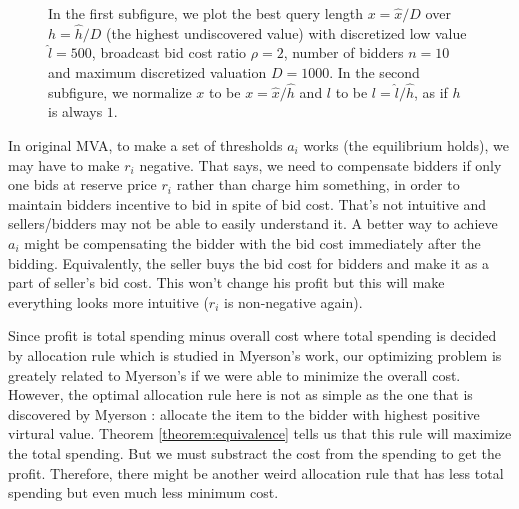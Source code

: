 \begin{figure}
\centering
  \caption{In the first subfigure, we plot the best query length $x = \hat x / D$ over $h = \hat h / D$ (the highest
      undiscovered value) with discretized low value $\hat l = 500$,
      broadcast bid cost ratio $\rho = 2$,
      number of bidders $n = 10$ and maximum discretized valuation
      $D = 1000$. In the second subfigure, we normalize $x$ to be $x = \hat x / \hat h$ and
      $l$ to be $l = \hat l / \hat h$, as if $h$ is always $1$.}
\end{figure}

\begin{proposition}
In original MVA, to make a set of thresholds $a_i$ works (the
equilibrium holds), we may have to make $r_i$ negative. That says, we need to
compensate bidders if only one bids at reserve price $r_i$ rather than charge
him something, in order to maintain bidders incentive to bid in spite of
bid cost. That's not intuitive and sellers/bidders may
not be able to easily understand it. A better way to achieve $a_i$ might be
compensating the bidder with the bid cost immediately after the bidding.
Equivalently, the seller buys the bid cost for bidders and make it as a
part of seller's bid cost. This won't change his profit but this will make
everything looks more intuitive ($r_i$ is non-negative again).
\end{proposition}

Since profit is total spending minus overall cost where total spending is
decided by allocation rule which is studied in Myerson's work, our optimizing
problem is greately related to Myerson's if we were able to minimize the
overall cost. However, the optimal allocation rule here is not as simple as the
one that is discovered by Myerson \cite{Myerson:1981}: allocate the item to the
bidder with highest positive virtural value.  Theorem \ref{theorem:equivalence}
tells us that this rule will maximize the total spending.  But we must
substract the cost from the spending to get the profit.  Therefore, there might
be another weird allocation rule that has less total spending but even much
less minimum cost.

